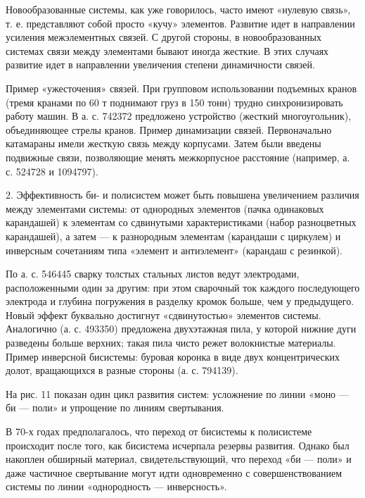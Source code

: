 Новообразованные  системы, как  уже говорилось,  часто имеют  «нулевую
связь»,  т. е.  представляют собой  просто «кучу»  элементов. Развитие
идет в  направлении усиления  межэлементных связей. С  другой стороны,
в  новообразованных  системах  связи между  элементами  бывают  иногда
жесткие. В этих случаях развитие идет в направлении увеличения степени
динамичности связей.

Пример  «ужесточения» связей.  При  групповом использовании  подъемных
кранов  (тремя   кранами  по   60  т  поднимают   груз  в   150  тонн)
трудно  синхронизировать  работу  машин.  В а.  с.  742372  предложено
устройство (жесткий многоугольник), объединяющее стрелы кранов. Пример
динамизации связей. Первоначально катамараны имели жесткую связь между
корпусами.  Затем были  введены  подвижные  связи, позволяющие  менять
межкорпусное расстояние (например, а. с. 524728 и 1094797).



2.  Эффективность би-  и  полисистем может  быть повышена  увеличением
различия  между элементами  системы:  от  однородных элементов  (пачка
одинаковых  карандашей)  к  элементам со  сдвинутыми  характеристиками
(набор  разноцветных карандашей),  а затем  — к  разнородным элементам
(карандаши  с  циркулем)  и   инверсным  сочетаниям  типа  «элемент  и
антиэлемент» (карандаш с резинкой).

По  а. с.  546445 сварку  толстых стальных  листов ведут  электродами,
расположенными  один  за  другим:   при  этом  сварочный  ток  каждого
последующего электрода и глубина  погружения в разделку кромок больше,
чем  у предыдущего.  Новый эффект  буквально достигнут  «сдвинутостью»
элементов системы.  Аналогично (а.  с. 493350)  предложена двухэтажная
пила, у которой нижние дуги разведены больше верхних; такая пила чисто
режет  волокнистые  материалы.  Пример  инверсной  бисистемы:  буровая
коронка  в  виде  двух  концентрических долот,  вращающихся  в  разные
стороны (а. с. 794139).

На  рис. 11  показан один  цикл развития  систем: усложнение  по линии
«моно — би — поли» и упрощение по линиям свертывания.

В 70-х  годах предполагалось, что  переход от бисистемы  к полисистеме
происходит  после  того,  как бисистема  исчерпала  резервы  развития.
Однако был накоплен обширный  материал, свидетельствующий, что переход
«би —  поли» и  даже частичное свертывание  могут идти  одновременно с
совершенствованием системы по линии «однородность — инверсность».


